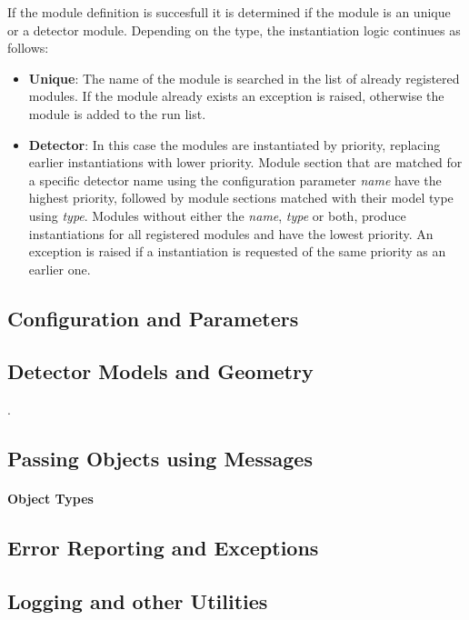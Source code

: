 If the module definition is succesfull it is determined if the module is an unique or a detector module. Depending on the type, the instantiation logic continues as follows:
\begin{itemize}
\item \textbf{Unique}: The name of the module is searched in the list of already registered modules. If the module already exists an exception is raised, otherwise the module is added to the run list.
\item \textbf{Detector}: In this case the modules are instantiated by priority, replacing earlier instantiations with lower priority. Module section that are matched for a specific detector name using the configuration parameter \textit{name} have the highest priority, followed by module sections matched with their model type using \textit{type}. Modules without either the \textit{name}, \textit{type} or both, produce instantiations for all registered modules and have the lowest priority. An exception is raised if a instantiation is requested of the same priority as an earlier one.
\end{itemize}

\subsection{Configuration and Parameters}
\label{sec:config_parameters}
\subsection{Detector Models and Geometry}
\label{sec:models_geometry}.
\subsection{Passing Objects using Messages}
\label{sec:objects_messages}
\paragraph{Object Types}
\subsection{Error Reporting and Exceptions}
\subsection{Logging and other Utilities}
\label{sec:logging_utilities}
